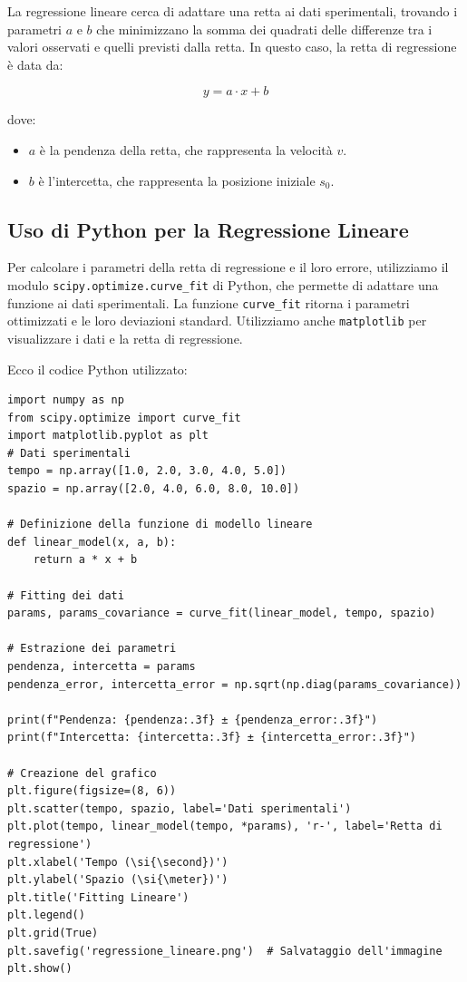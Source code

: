 \documentclass[a4paper,12pt]{article}
\begin{document}
La regressione lineare cerca di adattare una retta ai dati sperimentali, trovando i parametri \( a \) e \( b \) che minimizzano la somma dei quadrati delle differenze tra i valori osservati e quelli previsti dalla retta. In questo caso, la retta di regressione è data da:

\[
y = a \cdot x + b
\]

dove:
\begin{itemize}
    \item \( a \) è la pendenza della retta, che rappresenta la velocità \( v \).
    \item \( b \) è l'intercetta, che rappresenta la posizione iniziale \( s_0 \).
\end{itemize}

\subsection{Uso di Python per la Regressione Lineare}
Per calcolare i parametri della retta di regressione e il loro errore, utilizziamo il modulo \texttt{scipy.optimize.curve\_fit} di Python, che permette di adattare una funzione ai dati sperimentali. La funzione \texttt{curve\_fit} ritorna i parametri ottimizzati e le loro deviazioni standard. Utilizziamo anche \texttt{matplotlib} per visualizzare i dati e la retta di regressione.


Ecco il codice Python utilizzato:

\begin{lstlisting}
import numpy as np
from scipy.optimize import curve_fit
import matplotlib.pyplot as plt
# Dati sperimentali
tempo = np.array([1.0, 2.0, 3.0, 4.0, 5.0])
spazio = np.array([2.0, 4.0, 6.0, 8.0, 10.0])

# Definizione della funzione di modello lineare
def linear_model(x, a, b):
    return a * x + b

# Fitting dei dati
params, params_covariance = curve_fit(linear_model, tempo, spazio)

# Estrazione dei parametri
pendenza, intercetta = params
pendenza_error, intercetta_error = np.sqrt(np.diag(params_covariance))

print(f"Pendenza: {pendenza:.3f} ± {pendenza_error:.3f}")
print(f"Intercetta: {intercetta:.3f} ± {intercetta_error:.3f}")

# Creazione del grafico
plt.figure(figsize=(8, 6))
plt.scatter(tempo, spazio, label='Dati sperimentali')
plt.plot(tempo, linear_model(tempo, *params), 'r-', label='Retta di regressione')
plt.xlabel('Tempo (\si{\second})')
plt.ylabel('Spazio (\si{\meter})')
plt.title('Fitting Lineare')
plt.legend()
plt.grid(True)
plt.savefig('regressione_lineare.png')  # Salvataggio dell'immagine
plt.show()
\end{lstlisting}
\end{document}
